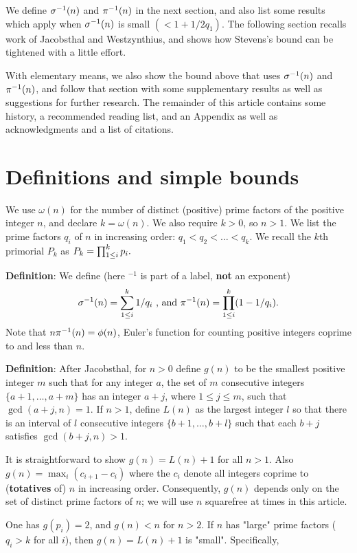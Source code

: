 \documentclass[12pt,leqno]{article}
\begin{document}
We define ${\sigma}^{-1}(n)$ and ${\pi}^{-1}(n)$ in the next section, and also list
some results which apply when ${\sigma}^{-1}(n)$ is small $(\lt 1 + 1/2q_1)$. 
The following section recalls work of Jacobsthal and
Westzynthius, and shows how Stevens's bound can be tightened with
a little effort. 

With elementary means, we also show the bound above that uses ${\sigma}^{-1}(n)$ and
${\pi}^{-1}(n)$, and follow that section with some supplementary results as
well as suggestions for further research.  The remainder of this 
article contains some history, a recommended reading list, and an
Appendix as well as acknowledgments and a list of citations.

\section{Definitions and simple bounds}


We use $\omega(n)$ for the number of distinct (positive)
prime factors of the positive integer $n$, and declare
$k=\omega(n)$.  We also require $k \gt 0$, so $n \gt 1$.
We list the prime factors $q_i$ of $n$ in increasing order:
$q_1 \lt q_2 \lt \ldots \lt q_k$. 
We recall the $k$th primorial $P_k$ as $P_k=\prod_{1 \leq i}^k p_i.$
 
\textbf{Definition}: We define (here $^{-1}$ is
part of a label, \textbf{not} an exponent)
$${\sigma}^{-1}(n) = \sum_{1 \leq i}^k 1/q_i \textrm{ , and } 
{\pi}^{-1}(n) = \prod_{1 \leq i}^k (1 - 1/q_i).$$
Note that $n{\pi}^{-1}(n) = \phi(n)$, Euler's function for counting
positive integers coprime to and less than $n$.

\textbf{Definition}: After Jacobsthal, for $n \gt 0$ 
define  $g(n)$ to be the smallest positive integer 
$m$ such that for any integer $a$, the set of $m$ consecutive 
integers $\{a+1,\ldots, a+m\}$ has an integer $a+j$, where 
$1 \leq j \leq m$, such that $\gcd(a+j,n)=1$.  If $n \gt 1$,
define $L(n)$ as the largest integer $l$ so that there is an 
interval of $l$ consecutive integers $\{b+1,\ldots, b+l\}$ such
that each $b+j$ satisfies $\gcd(b+j,n) \gt 1$.

It is straightforward to show $g(n)=L(n)+1$ for all 
$n \gt 1$.  Also $g(n) = \max_i (c_{i+1} - c_i)$ where
the $c_i$ denote all integers coprime to (\textbf{totatives} of)
 $n$ in increasing
order.  Consequently, $g(n)$ depends only on the set
of distinct prime factors of $n$; we will use $n$
squarefree at times in this article.

One has $g(p_i)=2$, and $g(n) \lt n$ for $n \gt 2$.  If $n$
has "large" prime factors ($q_i \gt k$ for all $i$), then
$g(n)=L(n)+1$ is "small".  Specifically,
\end{document}

